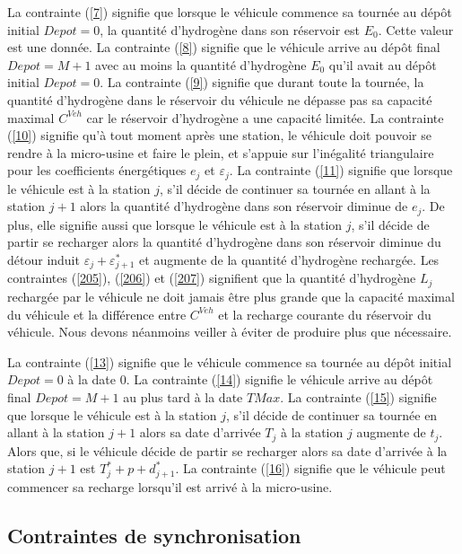 La contrainte (\ref{7}) signifie que lorsque le véhicule commence sa tournée au dépôt initial $Depot=0$, la quantité d'hydrogène dans son réservoir est $E_0$. Cette valeur est une donnée. La contrainte (\ref{8}) signifie que le véhicule arrive au dépôt final $Depot=M+1$ avec au moins la quantité d'hydrogène $E_0$
qu'il avait au dépôt initial $Depot=0$. La contrainte (\ref{9}) signifie que durant toute la tournée, la quantité d'hydrogène dans le réservoir du véhicule ne dépasse pas sa capacité maximal $C^{Veh}$ car le réservoir d'hydrogène a une capacité limitée. La contrainte (\ref{10}) signifie qu'à tout moment après une station, le véhicule doit pouvoir se rendre à la micro-usine et faire le plein, et s'appuie sur l'inégalité triangulaire pour les coefficients énergétiques $e_j$ et $\varepsilon_j$. La contrainte (\ref{11}) signifie que lorsque le véhicule est à la station $j$, s'il décide de continuer sa tournée en allant à la station $j+1$ alors la quantité d'hydrogène dans son réservoir diminue de $e_j$. De plus, elle signifie aussi que lorsque le véhicule est à la station $j$, s'il décide de partir se recharger alors la quantité d'hydrogène dans son réservoir diminue du détour induit $\varepsilon_j+\varepsilon^*_{j+1}$ et augmente de la quantité d'hydrogène rechargée. Les contraintes (\ref{205}), (\ref{206}) et (\ref{207}) signifient que la quantité d'hydrogène $L_j$ rechargée par le véhicule ne doit jamais être plus grande que la capacité maximal du véhicule et la différence entre $C^{Veh}$ et la recharge courante du réservoir du véhicule. Nous devons néanmoins veiller à éviter de produire plus que nécessaire.

La contrainte (\ref{13}) signifie que le véhicule commence sa tournée au dépôt initial $ Depot=0$ à la date 0. La contrainte (\ref{14}) signifie le véhicule arrive au dépôt final $Depot=M+1$ au plus tard à la date $TMax$. La contrainte (\ref{15}) signifie que lorsque le véhicule est à la station $j$, s'il décide de continuer sa tournée en allant à la station $j+1$ alors sa date d'arrivée $T_j$ à la station $j$ augmente de $t_j$. Alors que, si le véhicule décide de partir se recharger alors sa date d'arrivée à la station $j+1$ est $T^*_j+p+d^*_{j+1}$. La contrainte (\ref{16}) signifie que le véhicule peut commencer sa recharge lorsqu'il est arrivé à la micro-usine.

\subsection{Contraintes de synchronisation}

